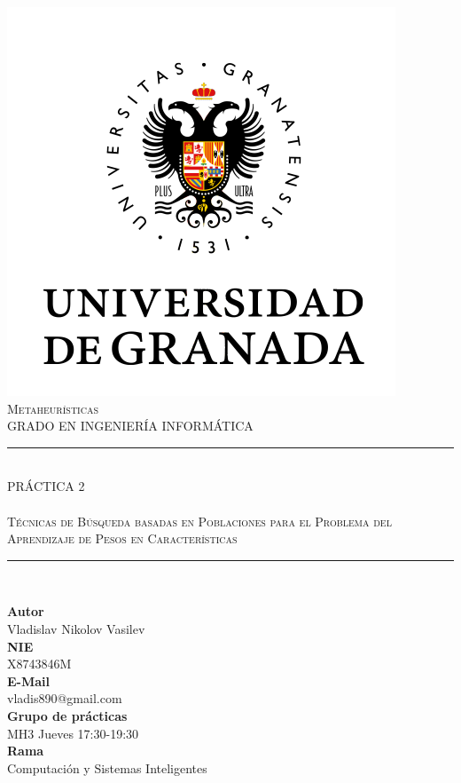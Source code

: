 \documentclass[11pt,a4paper]{article}
\newcommand{\asignatura}{Metaheurísticas}
\begin{document}

\begin{titlepage}

\begin{minipage}{\textwidth}

\centering

\includegraphics[scale=0.3]{img/ugr.png}\\

\textsc{\Large \asignatura{}\\[0.2cm]}
\textsc{GRADO EN INGENIERÍA INFORMÁTICA}\\[0.3cm]

\noindent\rule[-1ex]{\textwidth}{1pt}\\[1.5ex]
\textsc{{\Huge PRÁCTICA 2\\[1pt]}}
\textsc{{\Large \\Técnicas de Búsqueda basadas en Poblaciones para el Problema del Aprendizaje de Pesos en Características}}
\noindent\rule[-1ex]{\textwidth}{2pt}\\[1ex]

\end{minipage}

\vspace{0.18cm}

\begin{minipage}{\textwidth}

\centering

\textbf{Autor}\\ {Vladislav Nikolov Vasilev}\\[1ex]
\textbf{NIE}\\ {X8743846M}\\[1ex]
\textbf{E-Mail}\\ {vladis890@gmail.com}\\[1ex]
\textbf{Grupo de prácticas}\\ {MH3 Jueves 17:30-19:30}\\[1ex]
\textbf{Rama}\\ {Computación y Sistemas Inteligentes}\\[1ex]
\vspace{0.2cm}


\end{minipage}
\end{titlepage}
\end{document}
